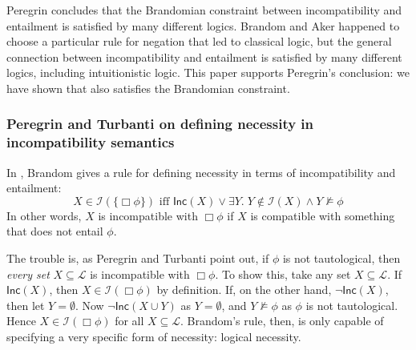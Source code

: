 Peregrin concludes that the Brandomian constraint between
incompatibility and entailment is satisfied by many different logics.
Brandom and Aker happened to choose a particular rule for negation
that led to classical logic, but the general connection between
incompatibility and entailment is satisfied by many different logics,
including intuitionistic logic.  This paper supports Peregrin's
conclusion: we have shown that \cathoristic{} also satisfies the
Brandomian constraint.


\subsubsection{Peregrin and Turbanti on defining necessity in incompatibility semantics}\label{peregrin}


In \cite{brandom}, Brandom gives a rule for defining necessity in terms of incompatibility and entailment:
\[
X \in \mathcal{I}(\{\Box \phi\}) \text{ iff } \mathsf{Inc}(X) \lor \exists Y . \; Y \notin \mathcal{I}(X) \land Y \nvDash \phi
\]
In other words, $X$ is incompatible with $\Box \phi$ if $X$ is compatible with something that does not entail $\phi$.

The trouble is, as Peregrin and Turbanti point out, if $\phi$ is not tautological, then \emph{every set} $X \subseteq \mathcal{L}$ is incompatible with $\Box \phi$.
To show this, take any set $X \subseteq \mathcal{L}$. 
If $\mathsf{Inc}(X)$, then $X \in \mathcal{I}(\Box \phi)$ by definition.
If, on the other hand, $\neg \mathsf{Inc}(X)$, then let $Y = \emptyset$.
Now $\neg \mathsf{Inc}(X \cup Y)$ as $Y = \emptyset$, and $Y \nvDash \phi$ as $\phi$ is not tautological.
Hence $X \in \mathcal{I}(\Box \phi)$ for all $X \subseteq \mathcal{L}$. 
Brandom's rule, then, is only capable of specifying a very specific form of necessity: logical necessity.

